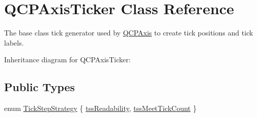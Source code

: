 \hypertarget{classQCPAxisTicker}{}\section{Q\+C\+P\+Axis\+Ticker Class Reference}
\label{classQCPAxisTicker}


The base class tick generator used by \hyperlink{classQCPAxis}{Q\+C\+P\+Axis} to create tick positions and tick labels.  




Inheritance diagram for Q\+C\+P\+Axis\+Ticker\+:
\subsection*{Public Types}
\begin{DoxyCompactItemize}
\item 
enum \hyperlink{classQCPAxisTicker_ab6d2f9d9477821623ac9bc4b21ddf49a}{Tick\+Step\+Strategy} \{ \hyperlink{classQCPAxisTicker_ab6d2f9d9477821623ac9bc4b21ddf49aa9002aa2fd5633ab5556c71a26fed63a8}{tss\+Readability}, 
\hyperlink{classQCPAxisTicker_ab6d2f9d9477821623ac9bc4b21ddf49aa770312b6b9b0c64a37ceeba96e0cd7f2}{tss\+Meet\+Tick\+Count}
 \}
\end{DoxyCompactItemize}
